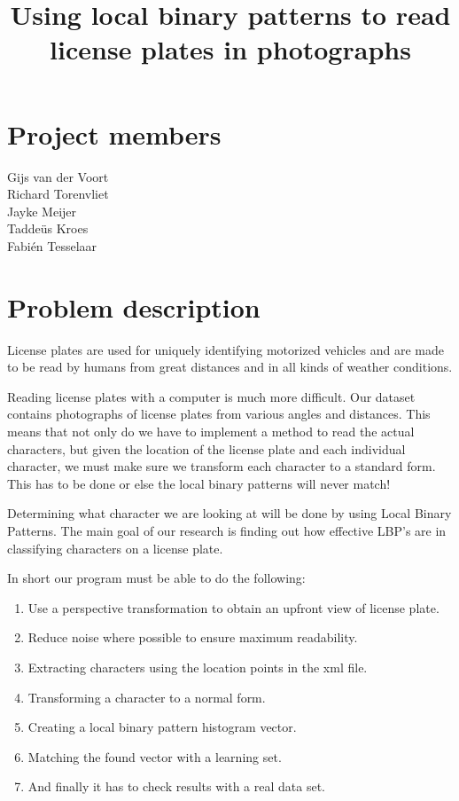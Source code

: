 \documentclass[a4paper]{article}
\title{Using local binary patterns to read license plates in photographs}
\begin{document}
\maketitle

\section*{Project members}
Gijs van der Voort\\
Richard Torenvliet\\
Jayke Meijer\\
Tadde\"us Kroes\\
Fabi\'en Tesselaar

\tableofcontents

\setcounter{secnumdepth}{1}

\section{Problem description}

License plates are used for uniquely identifying motorized vehicles and are
made to be read by humans from great distances and in all kinds of weather
conditions.

Reading license plates with a computer is much more difficult. Our dataset
contains photographs of license plates from various angles and distances. This
means that not only do we have to implement a method to read the actual
characters, but given the location of the license plate and each individual
character, we must make sure we transform each character to a standard form. 
This has to be done or else the local binary patterns will never match!

Determining what character we are looking at will be done by using Local Binary
Patterns. The main goal of our research is finding out how effective LBP's are
in classifying characters on a license plate.

In short our program must be able to do the following:

\begin{enumerate}
    \item Use a perspective transformation to obtain an upfront view of license
          plate.
    \item Reduce noise where possible to ensure maximum readability.
    \item Extracting characters using the location points in the xml file.
    \item Transforming a character to a normal form.
    \item Creating a local binary pattern histogram vector.
    \item Matching the found vector with a learning set.
    \item And finally it has to check results with a real data set.
\end{enumerate}
\end{document}

